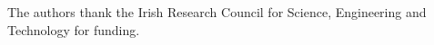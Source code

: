 \documentclass{aamas2012} %
\theoremstyle{remark}
\begin{document}
%
%
%
%
\acks

The authors thank the Irish Research Council for Science, Engineering and
Technology for funding.




\end{document}

